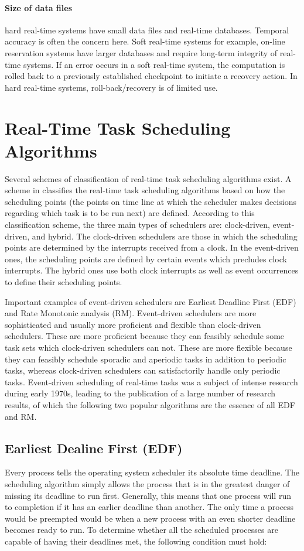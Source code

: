 \documentclass[10pt,article]{IEEEtran}
\begin{document}
\paragraph{Size of data files} hard real-time systems have small data files and real-time databases. Temporal accuracy is often the concern here. Soft real-time systems for example, on-line reservation systems have larger databases and require long-term integrity of real-time systems. If an error occurs in a soft real-time system, the computation is rolled back to a previously established checkpoint to initiate a recovery action. In hard real-time systems, roll-back/recovery is of limited use.
 

\section{Real-Time Task Scheduling Algorithms} \label{sec:rt-algs}
Several schemes of classification of real-time task scheduling algorithms exist. A scheme in \cite{mall} classifies the real-time task scheduling algorithms based on how the scheduling points (the points on time line at which the scheduler makes decisions regarding which task is to be run next) are defined. According to this classification scheme, the three main types of schedulers are: clock-driven, event-driven, and hybrid. The clock-driven schedulers are those in which the scheduling points are determined by the interrupts received from a clock. In the event-driven ones, the scheduling points are defined by certain events which precludes clock interrupts. The hybrid ones use both clock interrupts as well as event occurrences to define their scheduling points.


Important examples of event-driven schedulers are Earliest Deadline First (EDF) and Rate Monotonic analysis (RM). Event-driven schedulers are more sophisticated and usually more proficient and flexible than clock-driven schedulers. These are more proficient because they can feasibly schedule some task sets which clock-driven schedulers can not. These are more flexible because they can feasibly schedule sporadic and aperiodic tasks in addition to periodic tasks, whereas clock-driven schedulers can satisfactorily handle only periodic tasks\cite{mall}. Event-driven scheduling of real-time tasks was a subject of intense research during early 1970s, leading to the publication of a large number of research results, of which the following two popular algorithms are the essence of all EDF and RM\cite{w-s-liu}.

\subsection{Earliest Dealine First (EDF)}
Every process tells the operating system scheduler its absolute time deadline. The scheduling algorithm simply allows the process that is in the greatest danger of missing its deadline to run first. Generally, this means that one process will run to completion if it has an earlier deadline than another. The only time a process would be preempted would be when a new process with an even shorter deadline becomes ready to run. To determine whether all the scheduled processes are capable of having their deadlines met, the following condition must hold:
\end{document}
